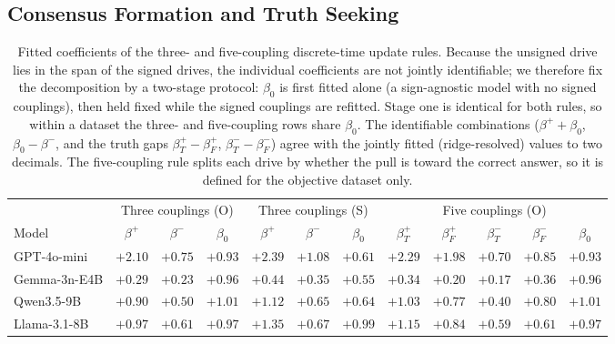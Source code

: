 \subsection{Consensus Formation and Truth Seeking}\label{sec:results_truthseeking}

\begin{table}[t]
\centering
\small
\setlength{\tabcolsep}{4pt}
\begin{tabular}{l ccc ccc ccccc}
\toprule
& \multicolumn{3}{c}{Three couplings (O)}
& \multicolumn{3}{c}{Three couplings (S)}
& \multicolumn{5}{c}{Five couplings (O)} \\
\cmidrule(lr){2-4} \cmidrule(lr){5-7} \cmidrule(lr){8-12}
Model & $\beta^{+}$ & $\beta^{-}$ & $\beta_{0}$
      & $\beta^{+}$ & $\beta^{-}$ & $\beta_{0}$
      & $\beta^{+}_{T}$ & $\beta^{+}_{F}$ & $\beta^{-}_{T}$ & $\beta^{-}_{F}$ & $\beta_{0}$ \\
\midrule
GPT-4o-mini   & $+2.10$ & $+0.75$ & $+0.93$ & $+2.39$ & $+1.08$ & $+0.61$ & $+2.29$ & $+1.98$ & $+0.70$ & $+0.85$ & $+0.93$ \\
Gemma-3n-E4B  & $+0.29$ & $+0.23$ & $+0.96$ & $+0.44$ & $+0.35$ & $+0.55$ & $+0.34$ & $+0.20$ & $+0.17$ & $+0.36$ & $+0.96$ \\
Qwen3.5-9B    & $+0.90$ & $+0.50$ & $+1.01$ & $+1.12$ & $+0.65$ & $+0.64$ & $+1.03$ & $+0.77$ & $+0.40$ & $+0.80$ & $+1.01$ \\
Llama-3.1-8B    & $+0.97$ & $+0.61$ & $+0.97$ & $+1.35$ & $+0.67$ & $+0.99$ & $+1.15$ & $+0.84$ & $+0.59$ & $+0.61$ & $+0.97$ \\
\bottomrule
\end{tabular}
\caption{Fitted coefficients of the three- and five-coupling discrete-time update rules. Because the unsigned drive lies in the span of the signed drives, the individual coefficients are not jointly identifiable; we therefore fix the decomposition by a two-stage protocol: $\beta_{0}$ is first fitted alone (a sign-agnostic model with no signed couplings), then held fixed while the signed couplings are refitted. Stage one is identical for both rules, so within a dataset the three- and five-coupling rows share $\beta_{0}$. The identifiable combinations ($\beta^{+}+\beta_{0}$, $\beta_{0}-\beta^{-}$, and the truth gaps $\beta^{+}_{T}-\beta^{+}_{F}$, $\beta^{-}_{T}-\beta^{-}_{F}$) agree with the jointly fitted (ridge-resolved) values to two decimals. The five-coupling rule splits each drive by whether the pull is toward the correct answer, so it is defined for the objective dataset only.\label{tab:couplings_five}}
\end{table}


